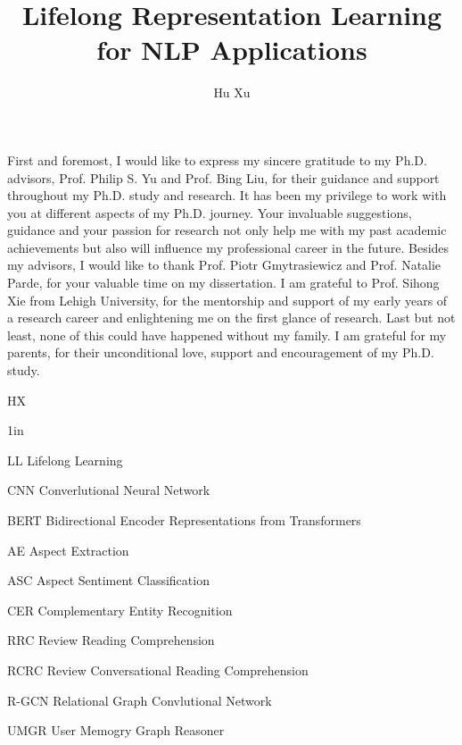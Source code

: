 \documentclass{uicthesi}
\begin{document}
\title{Lifelong Representation Learning for NLP Applications}
\author{Hu Xu}
\pdegrees{}
\maketitle


\acknowledgements
{First and foremost, I would like to express my sincere gratitude to my Ph.D. advisors, Prof. Philip
S. Yu and Prof. Bing Liu, for their guidance and support throughout my Ph.D. study and research. It has been my privilege
to work with you at different aspects of my Ph.D. journey. Your invaluable suggestions, guidance and
your passion for research not only help me with my past academic achievements but also will influence
my professional career in the future.
Besides my advisors, I would like to thank 
Prof. Piotr Gmytrasiewicz and Prof. Natalie Parde, for your valuable time on my dissertation.
I am grateful to Prof. Sihong Xie from Lehigh University, for the mentorship and support of my early years of a research career and enlightening me on the first glance of research. 
Last but not least, none of this could have happened without my family. I am grateful for my parents, for their unconditional love, support and encouragement of my Ph.D. study.\\

\begin{flushright}HX\end{flushright}}

\tableofcontents
\listoftables
\listoffigures
\listofabbreviations
\begin{list}
{}
{\setlength
  {}{1in}
    \setlength{\leftmargin}{1.5in}
    \setlength{\labelsep}{.5in}
    \setlength{\rightmargin}{\leftmargin}}
\item[LL\hfill] Lifelong Learning
\item[CNN\hfill] Converlutional Neural Network
\item[BERT\hfill] Bidirectional Encoder Representations from Transformers
\item[AE\hfill] Aspect Extraction
\item[ASC\hfill] Aspect Sentiment Classification
\item[CER\hfill] Complementary Entity Recognition
\item[RRC\hfill] Review Reading Comprehension
\item[RCRC\hfill] Review Conversational Reading Comprehension
\item[R-GCN\hfill] Relational Graph Convlutional Network
\item[UMGR\hfill] User Memogry Graph Reasoner
\end{list}
\end{document}
